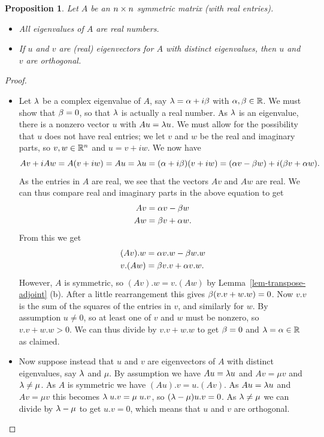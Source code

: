 \documentclass[reqno]{amsart}
\newtheorem{proposition}[theorem]{Proposition}
\theoremstyle{definition}
\begin{document}
\begin{proposition}\label{prop-symmetric-eigen}
 Let $A$ be an $n\times n$ symmetric matrix (with real entries).
 \begin{itemize}
  \item[(a)] All eigenvalues of $A$ are real numbers.
  \item[(b)] If $u$ and $v$ are (real) eigenvectors for $A$ with
   distinct eigenvalues, then $u$ and $v$ are orthogonal.
 \end{itemize}
\end{proposition}
\begin{proof}
 \begin{itemize}
  \item[(a)] Let $\lambda$ be a complex eigenvalue of $A$, say
   $\lambda=\alpha+i\beta$ with $\alpha,\beta\in{\mathbb{R}}$.  We must show that $\beta=0$, so
   that $\lambda$ is actually a real number.  As $\lambda$ is an eigenvalue,
   there is a nonzero vector $u$ with $Au=\lambda u$.  We must allow for
   the possibility that $u$ does not have real entries; we let $v$ and
   $w$ be the real and imaginary parts, so $v,w\in{\mathbb{R}}^n$ and $u=v+iw$.
   We now have
   \[ Av + iAw = A(v+iw) = Au = \lambda u =
       (\alpha+i\beta)(v+iw) = (\alpha v-\beta w)+i(\beta v+\alpha w).
   \]
   As the entries in $A$ are real, we see that the vectors $Av$ and
   $Aw$ are real.  We can thus compare real and imaginary parts in the
   above equation to get
   \begin{align*}
    Av &= \alpha v - \beta w \\
    Aw &= \beta v + \alpha w.
   \end{align*}
   From this we get
   \begin{align*}
    (Av).w &= \alpha v.w - \beta w.w \\
    v.(Aw) &= \beta v.v + \alpha v.w.
   \end{align*}
   However, $A$ is symmetric, so $(Av).w=v.(Aw)$ by
   Lemma~\ref{lem-transpose-adjoint} (b).  After a little rearrangement
   this gives $\beta(v.v+w.w)=0$.  Now $v.v$ is the sum of the squares
   of the entries in $v$, and similarly for $w$.  By assumption
   $u\neq 0$, so at least one of $v$ and $w$ must be nonzero, so
   $v.v+w.w>0$.  We can thus divide by $v.v+w.w$ to get $\beta=0$ and
   $\lambda=\alpha\in{\mathbb{R}}$ as claimed.
  \item[(b)] Now suppose instead that $u$ and $v$ are eigenvectors of
   $A$ with distinct eigenvalues, say $\lambda$ and $\mu$.  By assumption
   we have $Au=\lambda u$ and $Av=\mu v$ and $\lambda\neq\mu$.  As $A$ is
   symmetric we have $(Au).v=u.(Av)$.  As $Au=\lambda u$ and $Av=\mu v$
   this becomes $\lambda\;u.v=\mu\;u.v$, so $(\lambda-\mu)u.v=0$.  As
   $\lambda\neq\mu$ we can divide by $\lambda-\mu$ to get $u.v=0$, which means
   that $u$ and $v$ are orthogonal.
   \qedhere
 \end{itemize}
\end{proof}
\end{document}
